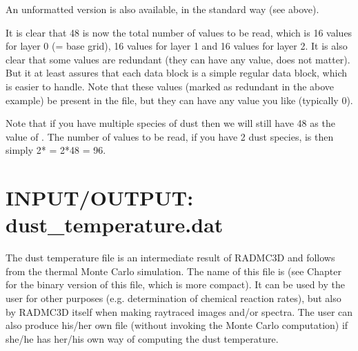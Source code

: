 \documentclass[letterpaper,10pt,english]{sphinxmanual}
\begin{document}
\begin{sphinxVerbatim}[commandchars=\\\{\}]
\PYG{p}{[}\PYG{p}{]}
\PYG{p}{[}\PYG{p}{]}
\PYG{p}{[}\PYG{p}{]}
\PYG{p}{[}\PYG{p}{]}
\end{sphinxVerbatim}

An unformatted version is also available, in the standard way (see above).

It is clear that 48 is now the total number of values to be read, which is
16 values for layer 0 (= base grid), 16 values for layer 1 and 16 values
for layer 2. It is also clear that some values are redundant (they can
have any value, does not matter). But it at least assures that each data
block is a simple regular data block, which is easier to handle. Note that
these values (marked as redundant in the above example)  be
present in the file, but they can have any value you like (typically 0).

Note that if you have multiple species of dust then we will still have
48 as the value of . The number of values to be read,
if you have 2 dust species, is then simply 2* = 2*48 = 96.


\section{INPUT/OUTPUT: dust\_temperature.dat}
\label{\detokenize{inputoutputfiles:input-output-dust-temperature-dat}}
The dust temperature file is an intermediate result of RADMC\sphinxhyphen{}3D and follows from
the thermal Monte Carlo simulation. The name of this file is
 (see Chapter {\hyperref[\detokenize{binaryio:chap-binary-io}]{}} for the binary
version of this file, which is more compact). It can be used by the user for
other purposes (e.g. determination of chemical reaction rates), but also by
RADMC\sphinxhyphen{}3D itself when making ray\sphinxhyphen{}traced images and/or spectra. The user can also
produce his/her own  file (without invoking the Monte
Carlo computation) if she/he has her/his own way of computing the dust
temperature.
\end{document}
